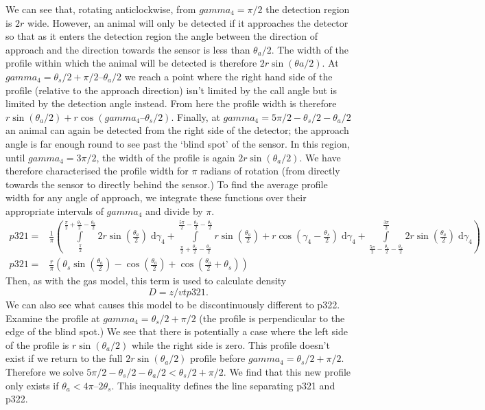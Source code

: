 \documentclass[a4paper,10pt,reqno,oneside]{amsart}
\begin{document}
We can see that, rotating anticlockwise, from $ gamma_4  = \pi/2$ the detection region is $2r$ wide. However, an animal will only be detected if it approaches the detector so that as it enters the detection region the angle between the direction of approach and the direction towards the sensor is less than $\theta_a/2$. The width of the profile within which the animal will be detected is therefore $2r\sin(θa/2)$. At $ gamma_4  = \theta_s/2 + \pi/2 – \theta_a/2$ we reach a point where the right hand side of the profile (relative to the approach direction) isn't limited by the call angle but is limited by the detection angle instead. From here the profile width is therefore $r\sin( \theta_a/2) + r\cos(  gamma_4  – \theta_s/2)$. Finally, at $ gamma_4  = 5\pi/2 - \theta_s/2  - \theta_a/2$ an animal can again be detected from the right side of the detector; the approach angle is far enough round to see past the `blind spot' of the sensor. In this region, until $ gamma_4  = 3\pi/2$, the width of the profile is again $2r\sin( \theta_a/2)$. We have therefore characterised the profile width for $\pi$ radians of rotation (from directly towards the sensor to directly behind the sensor.) To find the average profile width for any angle of approach, we integrate these functions over their appropriate intervals of $ gamma_4 $ and divide by $\pi$.
\begin{align}
    p321 =&\frac{1}{\pi} \left(\int\limits_{\frac{\pi}{2}}^{\frac{\pi}{2} + \frac{\theta_{s}}{2} - \frac{\theta_{a}}{2}}2 r \sin{\left (\frac{\theta_{a}}{2} \right )}\;\mathrm{d}\gamma_{4}+\int\limits_{\frac{\pi}{2} + \frac{\theta_{s}}{2} - \frac{\theta_{a}}{2}}^{\frac{5 \pi}{2} - \frac{\theta_{s}}{2} - \frac{\theta_{a}}{2}}r \sin{\left (\frac{\theta_{a}}{2} \right )} + r \cos{\left (\gamma_{4} - \frac{\theta_{s}}{2} \right )}\;\mathrm{d}\gamma_{4}+\int\limits_{\frac{5 \pi}{2} - \frac{\theta_{s}}{2} - \frac{\theta_{a}}{2}}^{\frac{3 \pi}{2}}2 r \sin{\left (\frac{\theta_{a}}{2} \right )}\;\mathrm{d}\gamma_{4}\right)\\
    p321 =& \frac{r}{\pi} \left(\theta_{s} \sin{\left (\frac{\theta_{a}}{2} \right )} - \cos{\left (\frac{\theta_{a}}{2} \right )} + \cos{\left (\frac{\theta_{a}}{2} + \theta_{s} \right )}\right)
\end{align}
Then, as with the gas model, this term is used to calculate density
\begin{equation}
D = z/vtp321. 
\end{equation}
We can also see what causes this model to be discontinuously different to p322. Examine the profile at $ gamma_4 = \theta_s/2 + \pi/2$ (the profile is perpendicular to the edge of the blind spot.) We see that there is potentially a case where the left side of the profile is $r\sin( \theta_a/2)$ while the right side is zero. This profile doesn't exist if we return to the full $2r\sin( \theta_a/2)$ profile before $ gamma_4  = \theta_s/2 + \pi/2$. Therefore we solve $5\pi/2 - \theta_s/2 - \theta_a/2 <  \theta_s/2 + \pi/2$. We find that this new profile only exists if $ \theta_a < 4\pi – 2 \theta_s$. This inequality defines the line separating p321 and p322.
\end{document}
